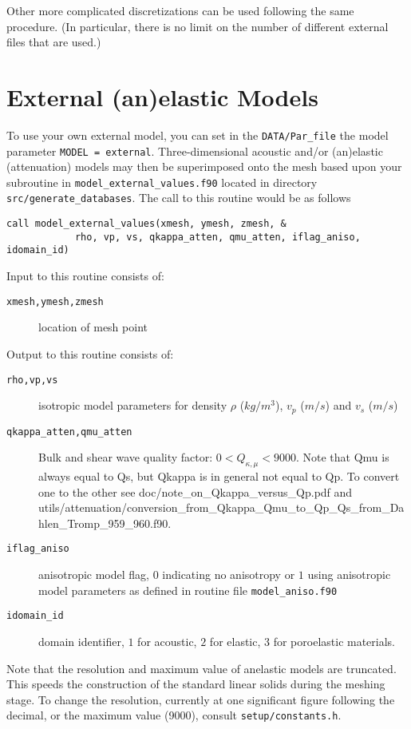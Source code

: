 Other more complicated discretizations can be used following the same procedure. (In particular, there is no limit on the number of different external files that are used.)



\section{External (an)elastic Models}\label{sec:Anelastic-Models}

To use your own external model, you can set in the \texttt{DATA/Par\_file}
the model parameter \texttt{MODEL = external}. Three-dimensional acoustic
and/or (an)elastic (attenuation) models may then be superimposed onto
the mesh based upon your subroutine in \texttt{model\_external\_values.f90}
located in directory \texttt{src/generate\_databases}. The call to
this routine would be as follows
\begin{verbatim}
call model_external_values(xmesh, ymesh, zmesh, &
            rho, vp, vs, qkappa_atten, qmu_atten, iflag_aniso, idomain_id)
\end{verbatim}
Input to this routine consists of:
\begin{description}
\item [{\texttt{xmesh,ymesh,zmesh}}] location of mesh point
\end{description}
Output to this routine consists of:
\begin{description}
\item [{\texttt{rho,vp,vs}}] isotropic model parameters for density $\rho$
($kg/m^{3}$), $v_{p}$ ($m/s$) and $v_{s}$ ($m/s$)
\item [{\texttt{qkappa\_atten,qmu\_atten}}] Bulk and shear wave quality factor: $0<Q_{\kappa,\mu}<9000$.
Note that Qmu is always equal to Qs, but Qkappa is in general not equal to Qp. To convert one to the other see doc/note\_on\_Qkappa\_versus\_Qp.pdf and utils/attenuation/conversion\_from\_Qkappa\_Qmu\_to\_Qp\_Qs\_from\_Dahlen\_Tromp\_959\_960.f90.
\item [{\texttt{iflag\_aniso}}] anisotropic model flag, $0$ indicating
no anisotropy or $1$ using anisotropic model parameters as defined
in routine file \texttt{model\_aniso.f90}
\item [{\texttt{idomain\_id}}] domain identifier, $1$ for acoustic, $2$
for elastic, $3$ for poroelastic materials.
\end{description}
Note that the resolution and maximum value of anelastic models are
truncated. This speeds the construction of the standard linear solids
during the meshing stage. To change the resolution, currently at one
significant figure following the decimal, or the maximum value (9000),
consult \texttt{setup/constants.h}.



